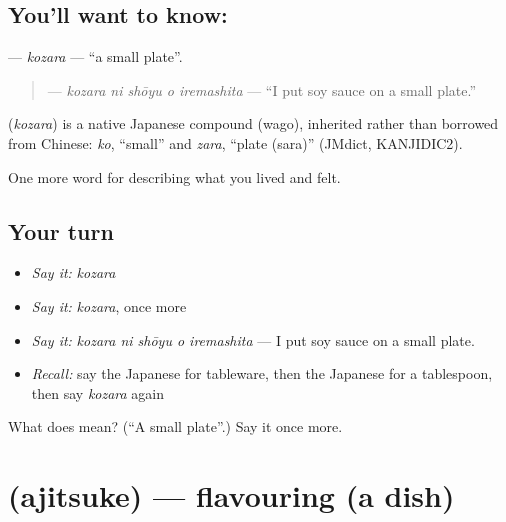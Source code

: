 \subsection*{You'll want to know: }
\textbf{} — \emph{kozara} — \textquotedblleft{}a small plate\textquotedblright{}.

\begin{quote}
\textbf{  } — \emph{kozara ni shōyu o iremashita} — \textquotedblleft{}I put soy sauce on a small plate.\textquotedblright{}
\end{quote}

\begin{cousinweb}
\textbf{} (\emph{kozara}) is a native Japanese compound (wago), inherited rather than borrowed from Chinese: \emph{ko}, \textquotedblleft{}small\textquotedblright{} and \emph{zara}, \textquotedblleft{}plate (sara)\textquotedblright{} (JMdict, KANJIDIC2).
\end{cousinweb}

\begin{grammarlens}[title={What you've built}]
One more word for describing what you lived and felt.
\end{grammarlens}

\subsection*{Your turn}
\begin{itemize}
\raggedright
  \item \emph{Say it:} \emph{kozara}
  \item \emph{Say it:} \emph{kozara}, once more
  \item \emph{Say it:} \emph{kozara ni shōyu o iremashita} — I put soy sauce on a small plate.
  \item \emph{Recall:} say the Japanese for tableware, then the Japanese for a tablespoon, then say \emph{kozara} again
\end{itemize}

\begin{tcolorbox}[breakable,colback=teal!4,colframe=teal!35!black,title={Before you move on}]
What does  mean? (\textquotedblleft{}A small plate\textquotedblright{}.) Say it once more.
\end{tcolorbox}
\section[\texorpdfstring{\ja{あじつけ} (ajitsuke)}{あじつけ (ajitsuke)}]{ (ajitsuke) — flavouring (a dish)}

